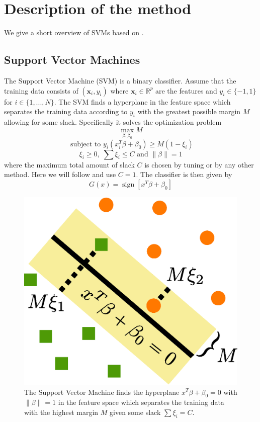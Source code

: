 \documentclass[12pt]{amsart}
\begin{document}
\section{Description of the method}
We give a short overview of SVMs based on \cite{hastie2009elements}.
\subsection{Support Vector Machines}


The Support Vector Machine (SVM) is a binary classifier. Assume that the training data consists of $(\mathbf x_i,y_i)$ where $\mathbf x_i \in \mathbb R^p$ are the features and $y_i \in \{-1,1 \}$ for $i \in \{ 1, ..., N \}$. The SVM finds a hyperplane in the feature space which separates the training data according to $y_i$ with the greatest possible margin $M$ allowing for some slack. Specifically it solves the optimization problem
\[ \max_{\beta,\beta_0} M \]
\[ \textrm{ subject to } y_i(x_i^T \beta + \beta_0) \geq M(1- \xi_i) \]
\[ \xi_i \geq 0,\; \sum \xi_i \leq C \textrm{ and } \| \beta \| = 1 \]
where the maximum total amount of slack $C$ is chosen by tuning or by any other method. Here we will follow \cite{yamada2003statistical} and use $C=1$. The classifier is then given by
\[G(x) = \operatorname{sign} [x^T \beta + \beta_0] \]

\begin{figure}
\center
\caption{The Support Vector Machine finds the hyperplane $x^T\beta + \beta_0 = 0$ with $\| \beta \| = 1$ in the feature space which separates the training data with the highest margin $M$ given some slack $\sum \xi_i = C$.}
\includegraphics[scale=0.5]{svm.eps}
\end{figure}
\end{document}
